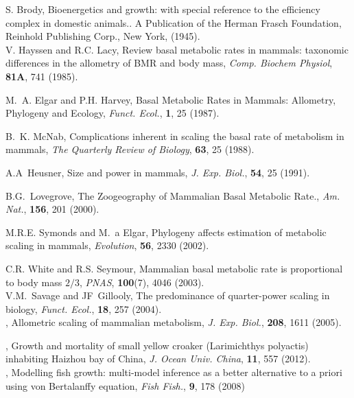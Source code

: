 \documentclass[10pt]{iopart}
\begin{document}
\begin{thebibliography}{100}
 S. Brody, {Bioenergetics and growth: with special reference to the efficiency complex in domestic animals.}. A Publication of the Herman Frasch Foundation, Reinhold Publishing Corp., New York, (1945).\\ 

 V. Hayssen and R.C. Lacy, {Review basal metabolic rates in mammals:  taxonomic differences in the allometry of BMR and body mass}, \textit{Comp. Biochem Physiol}, \textbf{81A},  741 (1985).

 M.~A. Elgar and P.H. Harvey, {Basal Metabolic Rates in Mammals: Allometry, Phylogeny and Ecology}, \textit{Funct. Ecol.}, \textbf{1}, 25 (1987).

 B.~K. McNab, {Complications inherent in scaling the basal rate of metabolism in mammals}, \textit{The Quarterly Review of Biology}, \textbf{63}, 25 (1988).

 A.A~Heusner, {Size and power in mammals}, \textit{ J. Exp. Biol.}, \textbf{54}, 25 (1991).

 B.G.~Lovegrove, {The Zoogeography of Mammalian Basal Metabolic Rate.}, \textit{Am. Nat.}, \textbf{156}, 201 (2000).

 M.R.E. Symonds and M.~a Elgar, {Phylogeny affects estimation of metabolic scaling in mammals}, \textit{Evolution}, \textbf{56}, 2330 (2002).

 C.R. White and R.S. Seymour, {Mammalian basal metabolic rate is proportional to body mass $2/3$}, \textit{PNAS}, \textbf{100}(7), 4046 (2003).\\

 V.M.~Savage and JF~Gillooly, {The predominance of quarter-power scaling in biology}, \textit{Funct. Ecol.}, \textbf{18}, 257 (2004).\\

, {Allometric scaling of mammalian metabolism}, \textit{J. Exp. Biol.}, \textbf{208}, {1611} {(2005)}.

, {Growth and mortality of small yellow croaker (Larimichthys polyactis) inhabiting Haizhou bay of China}, \textit{J. Ocean Univ. China}, \textbf{11}, {557} {(2012)}.\\

, {Modelling fish growth: multi-model inference as a better alternative to a priori using von Bertalanffy equation}, \textit{Fish Fish.}, \textbf{9}, {178} {(2008)}


\end{thebibliography}
\end{document}
